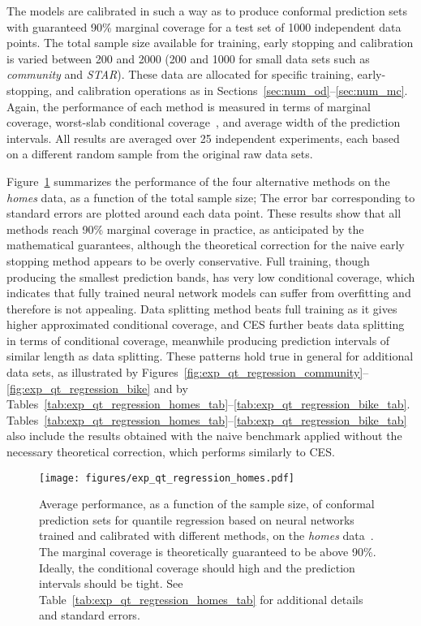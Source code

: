 The models are calibrated in such a way as to produce conformal prediction sets with guaranteed 90\% marginal coverage for a test set of 1000 independent data points. The total sample size available for training, early stopping and calibration is varied between 200 and 2000 (200 and 1000 for small data sets such as {\em community} and {\em STAR}).
These data are allocated for specific training, early-stopping, and calibration operations as in Sections~\ref{sec:num_od}--\ref{sec:num_mc}.
Again, the performance of each method is measured in terms of marginal coverage, worst-slab conditional coverage~\cite{cauchois2020knowing}, and average width of the prediction intervals. All results are averaged over 25 independent experiments, each based on a different random sample from the original raw data sets.


Figure~\ref{fig:exp_qt_regression_homes} summarizes the performance of the four alternative methods on the {\em homes} data, as a function of the total sample size; The error bar corresponding to standard errors are plotted around each data point. These results show that all methods reach 90\% marginal coverage in practice, as anticipated by the mathematical guarantees, although the theoretical correction for the naive early stopping method appears to be overly conservative. Full training, though producing the smallest prediction bands, has very low conditional coverage, which indicates that fully trained neural network models can suffer from overfitting and therefore is not appealing. Data splitting method beats full training as it gives higher approximated conditional coverage, and CES further beats data splitting in terms of conditional coverage, meanwhile producing prediction intervals of similar length as data splitting. These patterns hold true in general for additional data sets, as illustrated by Figures~\ref{fig:exp_qt_regression_community}--\ref{fig:exp_qt_regression_bike} and by Tables~\ref{tab:exp_qt_regression_homes_tab}--\ref{tab:exp_qt_regression_bike_tab}.
Tables~\ref{tab:exp_qt_regression_homes_tab}--\ref{tab:exp_qt_regression_bike_tab} also include the results obtained with the naive benchmark applied without the necessary theoretical correction, which performs similarly to CES.

\begin{figure}[!htb]
    \centering
    \texttt{[image: figures/exp\_qt\_regression\_homes.pdf]}\vspace{-0.5cm}
    \caption{Average performance, as a function of the sample size, of conformal prediction sets for quantile regression based on neural networks trained and calibrated with different methods, on the {\em homes} data~\cite{homes}. The marginal coverage is theoretically guaranteed to be above 90\%. Ideally, the conditional coverage should high and the prediction intervals should be tight. See Table~\ref{tab:exp_qt_regression_homes_tab} for additional details and standard errors.}
    \label{fig:exp_qt_regression_homes}
\end{figure}


